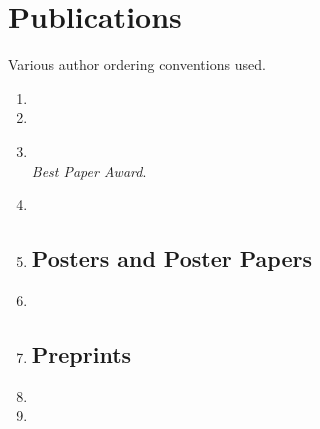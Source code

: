 \documentclass[10pt]{article}
\begin{document}
\section*{Publications}

Various author ordering conventions used. 

\begin{enumerate}
  
\subsection*{Journal and Conference Papers}

\item {}

\item {}

\item {}\\
\textit{Best Paper Award}.

\item {}

\item {}

\subsection*{Posters and Poster Papers}

\item {}

\item {}

\subsection*{Preprints}

\item {}

\item {}

\end{enumerate}
\end{document}
